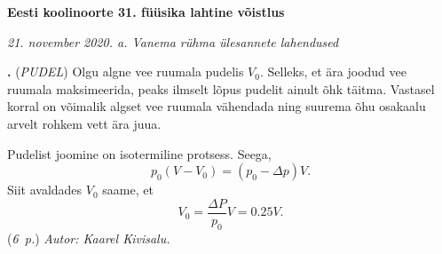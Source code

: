 \documentclass[12pt,a5paper]{article}
\newcommand{\numb}[1]{\vspace{5pt}\textbf{\large #1}}
\newcommand{\nimi}[1]{(\textsl{\small #1})}
\newcommand{\punktid}[1]{(\emph{#1~p.})}
\newcommand{\autor}[1]{\emph{ Autor: #1.}}
\newcounter{ylesanne}
\newcommand{\yl}[1]{\addtocounter{ylesanne}{1}\numb{\theylesanne.} \nimi{#1} \newblock{}}
\begin{document}
\begin{center}
\textbf{\large Eesti koolinoorte 31. füüsika lahtine võistlus} \vspace{3pt}

\emph{21. november 2020. a. Vanema rühma ülesannete lahendused}
\end{center}



\yl{PUDEL}
Olgu algne vee ruumala pudelis $V_0$. Selleks, et ära joodud vee ruumala maksimeerida, peaks ilmselt lõpus pudelit ainult õhk täitma. Vastasel korral on võimalik algset vee ruumala vähendada ning suurema õhu osakaalu arvelt rohkem vett ära juua.

Pudelist joomine on isotermiline protsess. Seega,
\[
p_0 (V-V_0)=(p_0-\Delta p)V.
\]
Siit avaldades $V_0$ saame, et
\[
V_0=\frac{\Delta P}{p_0} V = \num{0.25} V.
\]
\punktid{6} \autor{Kaarel Kivisalu}
\end{document}
